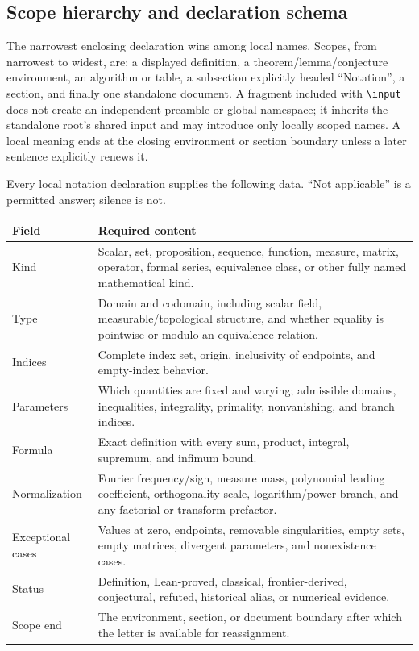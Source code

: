 \documentclass[11pt,oneside]{article}
\theoremstyle{definition}
\theoremstyle{remark}
\DeclareRobustCommand{\commandname}[1]{\texttt{\textbackslash#1}}
\begin{document}
\subsection{Scope hierarchy and declaration schema}

The narrowest enclosing declaration wins among local names.  Scopes, from narrowest to
widest, are: a displayed definition, a theorem/lemma/conjecture environment, an algorithm
or table, a subsection explicitly headed ``Notation'', a section, and finally one
standalone document.  A fragment included with \commandname{input} does not create an
independent preamble or global namespace; it inherits the standalone root's shared input
and may introduce only locally scoped names.  A local meaning ends at the closing
environment or section boundary unless a later sentence explicitly renews it.

Every local notation declaration supplies the following data.  ``Not applicable'' is a
permitted answer; silence is not.

\begingroup\small
\begin{longtable}{@{}p{}p{}@{}}
\toprule
Field & Required content\\
\midrule
\endhead
Kind & Scalar, set, proposition, sequence, function, measure, matrix, operator, formal
series, equivalence class, or other fully named mathematical kind.\\
Type & Domain and codomain, including scalar field, measurable/topological structure,
and whether equality is pointwise or modulo an equivalence relation.\\
Indices & Complete index set, origin, inclusivity of endpoints, and empty-index behavior.\\
Parameters & Which quantities are fixed and varying; admissible domains, inequalities,
integrality, primality, nonvanishing, and branch indices.\\
Formula & Exact definition with every sum, product, integral, supremum, and infimum bound.\\
Normalization & Fourier frequency/sign, measure mass, polynomial leading coefficient,
orthogonality scale, logarithm/power branch, and any factorial or transform prefactor.\\
Exceptional cases & Values at zero, endpoints, removable singularities, empty sets,
empty matrices, divergent parameters, and nonexistence cases.\\
Status & Definition, Lean-proved, classical, frontier-derived, conjectural, refuted,
historical alias, or numerical evidence.\\
Scope end & The environment, section, or document boundary after which the letter is
available for reassignment.\\
\bottomrule
\end{longtable}
\endgroup
\end{document}
